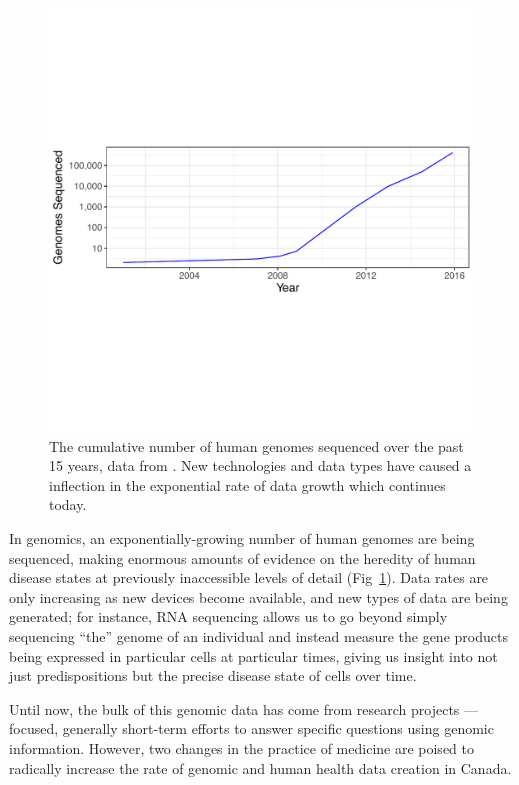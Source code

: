\documentclass[twoside,symmetric,sfsidenotes,notoc]{tufte-book}
\begin{document}
\begin{figure}
 \includegraphics{cumulative_genomes.pdf}
  \caption[Cumulative number of human genomes sequenced]{The cumulative number of human genomes sequenced over the past 15 years,
    data from \protect\citep{stephens2015big}.  New technologies and data types have caused a inflection in the exponential rate
    of data growth which continues today.}
  \label{fig:exponential-growth}
\end{figure}

In genomics, an exponentially-growing number of human genomes are
being sequenced, making enormous amounts of evidence on the heredity
of human disease states at previously inaccessible levels of detail
(Fig~\ref{fig:exponential-growth}).  Data rates are only increasing as
new devices become available, and new types of data are being
generated; for instance, RNA sequencing allows us to go beyond
simply sequencing ``the'' genome of an individual and instead measure
the gene products being expressed in particular cells at particular
times, giving us insight into not just predispositions but the precise
disease state of cells over time.

Until now, the bulk of this genomic data has come from research projects ---
focused, generally short-term efforts to answer specific questions using 
genomic information. However, two changes in the practice of medicine are
poised to radically increase the rate of genomic and human health data creation
in Canada.
\end{document}
